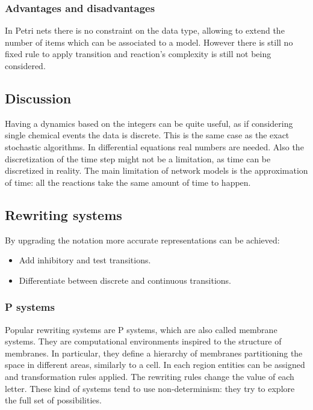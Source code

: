     \subsubsection{Advantages and disadvantages}
    In Petri nets there is no constraint on the data type, allowing to extend the number of items which can be associated to a model.
    However there is still no fixed rule to apply transition and reaction's complexity is still not being considered.

  \subsection{Discussion}
  Having a dynamics based on the integers can be quite useful, as if considering single chemical events the data is discrete.
  This is the same case as the exact stochastic algorithms.
  In differential equations real numbers are needed.
  Also the discretization of the time step might not be a limitation, as time can be discretized in reality.
  The main limitation of network models is the approximation of time: all the reactions take the same amount of time to happen.


  \subsection{Rewriting systems}
  By upgrading the notation more accurate representations can be achieved:

  \begin{multicols}{2}
    \begin{itemize}
      \item Add inhibitory and test transitions.
      \item Differentiate between discrete and continuous transitions.
    \end{itemize}
  \end{multicols}

    \subsubsection{P systems}
    Popular rewriting systems are P systems, which are also called membrane systems.
    They are computational environments inspired to the structure of membranes.
    In particular, they define a hierarchy of membranes partitioning the space in different areas, similarly to a cell.
    In each region entities can be assigned and transformation rules applied.
    The rewriting rules change the value of each letter.
    These kind of systems tend to use non-determinism: they try to explore the full set of possibilities.

